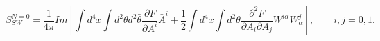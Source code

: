 \begin{equation}
S^{N=0}_{SW}=\frac{1}{4\pi}{Im}\left[ \int d^4 x\int
d^{2}\theta d^{2}\bar{\theta}
\frac{\partial F}{\partial A^{i}}\bar{A}^{i}+\frac{1}{2}\int d^4 x
\int d^{2}\theta 
\frac{\partial ^{2}F}{\partial A_{i}\partial A_{j}}W^{i\alpha
}W_{\alpha}^{j}
\right],\qquad  i,j=0,1.
\end{equation}


